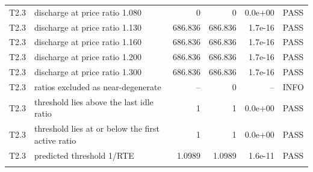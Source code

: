\begin{tabular}{llrrrl}
T2.3 & discharge at price ratio 1.080 & 0 & 0 & 0.0e+00 & PASS \\
T2.3 & discharge at price ratio 1.130 & 686.836 & 686.836 & 1.7e-16 & PASS \\
T2.3 & discharge at price ratio 1.160 & 686.836 & 686.836 & 1.7e-16 & PASS \\
T2.3 & discharge at price ratio 1.200 & 686.836 & 686.836 & 1.7e-16 & PASS \\
T2.3 & discharge at price ratio 1.300 & 686.836 & 686.836 & 1.7e-16 & PASS \\
T2.3 & ratios excluded as near-degenerate & -- & 0 & -- & INFO \\
T2.3 & threshold lies above the last idle ratio & 1 & 1 & 0.0e+00 & PASS \\
T2.3 & threshold lies at or below the first active ratio & 1 & 1 & 0.0e+00 & PASS \\
T2.3 & predicted threshold 1/RTE & 1.0989 & 1.0989 & 1.6e-11 & PASS \\
\noalign{\smallskip}\hline
\end{tabular}
